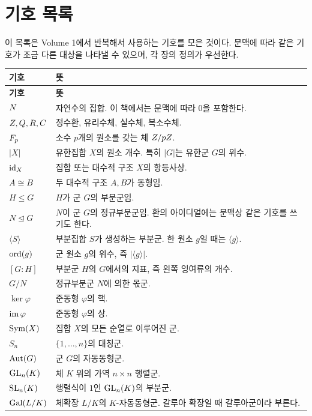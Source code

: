 \chapter*{기호 목록}

이 목록은 Volume 1에서 반복해서 사용하는 기호를 모은 것이다. 문맥에 따라 같은 기호가 조금 다른 대상을 나타낼 수 있으며, 각 장의 정의가 우선한다.

\renewcommand{\arraystretch}{1.25}
\begin{longtable}{>{\raggedright\arraybackslash}p{}p{}}
\toprule
\textbf{기호} & \textbf{뜻} \\
\midrule
\endfirsthead
\toprule
\textbf{기호} & \textbf{뜻} \\
\midrule
\endhead
\bottomrule
\endfoot

$N$ & 자연수의 집합. 이 책에서는 문맥에 따라 $0$을 포함한다. \\
$Z,Q,R,C$ & 정수환, 유리수체, 실수체, 복소수체. \\
$F_p$ & 소수 $p$개의 원소를 갖는 체 $Z/pZ$. \\
$|X|$ & 유한집합 $X$의 원소 개수. 특히 $|G|$는 유한군 $G$의 위수. \\
$\operatorname{id}_X$ & 집합 또는 대수적 구조 $X$의 항등사상. \\
$A\cong B$ & 두 대수적 구조 $A,B$가 동형임. \\

\addlinespace
$H\le G$ & $H$가 군 $G$의 부분군임. \\
$N\trianglelefteq G$ & $N$이 군 $G$의 정규부분군임. 환의 아이디얼에는 문맥상 같은 기호를 쓰기도 한다. \\
$\langle S\rangle$ & 부분집합 $S$가 생성하는 부분군. 한 원소 $g$일 때는 $\langle g\rangle$. \\
$\operatorname{ord}(g)$ & 군 원소 $g$의 위수, 즉 $|\langle g\rangle|$. \\
$[G:H]$ & 부분군 $H$의 $G$에서의 지표, 즉 왼쪽 잉여류의 개수. \\
$G/N$ & 정규부분군 $N$에 의한 몫군. \\
$\ker\varphi$ & 준동형 $\varphi$의 핵. \\
$\operatorname{im}\varphi$ & 준동형 $\varphi$의 상. \\
$\operatorname{Sym}(X)$ & 집합 $X$의 모든 순열로 이루어진 군. \\
$S_n$ & $\{1,\dots,n\}$의 대칭군. \\
$\operatorname{Aut}(G)$ & 군 $G$의 자동동형군. \\
$\operatorname{GL}_n(K)$ & 체 $K$ 위의 가역 $n\times n$ 행렬군. \\
$\operatorname{SL}_n(K)$ & 행렬식이 $1$인 $\operatorname{GL}_n(K)$의 부분군. \\
$\operatorname{Gal}(L/K)$ & 체확장 $L/K$의 $K$-자동동형군. 갈루아 확장일 때 갈루아군이라 부른다. \\


\end{longtable}

